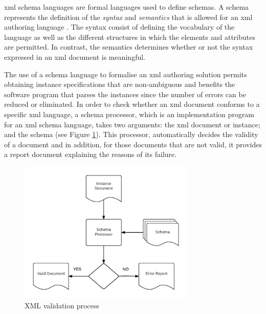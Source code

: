 	\gls{xml} schema languages are formal languages used to define schemas. A schema represents the definition of the \emph{syntax} and \emph{semantics} that is allowed for an \gls{xml} authoring language \cite{book:moller06}. The syntax consist of defining the vocabulary of the language as well as the different structures in which the elements and attributes are permitted. In contrast, the semantics determines whether or not the syntax expressed in an \gls{xml} document is meaningful. 

	The use of a schema language to formalise an \gls{xml} authoring solution permits obtaining instance specifications that are non-ambiguous and benefits the software program that parses the instances since the number of errors can be reduced or eliminated. In order to check whether an \gls{xml} document conforms to a specific \gls{xml} language, a schema processor, which is an implementation program for an \gls{xml} schema language, takes two arguments: the \gls{xml} document or instance; and the schema (see Figure \ref{fig:background:validationProcess}). This processor, automatically decides the validity of a document and in addition, for those documents that are not valid, it provides a report document explaining the reasons of its failure.

	\begin{figure}[H]
	\centering
	\includegraphics[width=0.75\textwidth]{background/img/validationProcess.png}
	\caption{XML validation process}
	\label{fig:background:validationProcess}
	\end{figure}

